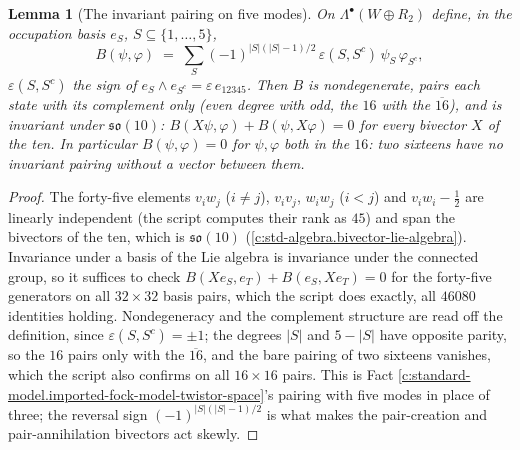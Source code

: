 \documentclass[11pt]{article}
\newtheorem{lemma}[theorem]{Lemma}
\theoremstyle{definition}
\theoremstyle{plain}
\providecommand{\so}{}\renewcommand{\so}{\mathfrak{so}}
\begin{document}
\begin{lemma}[The invariant pairing on five modes]\label{c:standard-model.invariant-pairing-five-modes}
On $\Lambda^{\bullet}(W \oplus R_{2})$ define, in the occupation basis $e_{S}$, $S \subseteq \{1, \ldots, 5\}$,
\[
B(\psi, \varphi) \;=\; \sum_{S} (-1)^{|S|(|S|-1)/2}\,\varepsilon(S, S^{c})\,\psi_{S}\,\varphi_{S^{c}},
\]
$\varepsilon(S, S^{c})$ the sign of $e_{S} \wedge e_{S^{c}} = \varepsilon\, e_{12345}$. Then $B$ is nondegenerate, pairs each state with its complement only (even degree with odd, the $16$ with the $\overline{16}$), and is invariant under $\so(10)$: $B(X\psi, \varphi) + B(\psi, X\varphi) = 0$ for every bivector $X$ of the ten. In particular $B(\psi, \varphi) = 0$ for $\psi, \varphi$ both in the $16$: two sixteens have no invariant pairing without a vector between them.
\end{lemma}
\begin{proof}
The forty-five elements $v_{i}w_{j}$ ($i \ne j$), $v_{i}v_{j}$, $w_{i}w_{j}$ ($i < j$) and $v_{i}w_{i} - \tfrac12$ are linearly independent (the script computes their rank as $45$) and span the bivectors of the ten, which is $\so(10)$ (\ref{c:std-algebra.bivector-lie-algebra}). Invariance under a basis of the Lie algebra is invariance under the connected group, so it suffices to check $B(Xe_{S}, e_{T}) + B(e_{S}, Xe_{T}) = 0$ for the forty-five generators on all $32 \times 32$ basis pairs, which the script does exactly, all $46080$ identities holding. Nondegeneracy and the complement structure are read off the definition, since $\varepsilon(S, S^{c}) = \pm 1$; the degrees $|S|$ and $5 - |S|$ have opposite parity, so the $16$ pairs only with the $\overline{16}$, and the bare pairing of two sixteens vanishes, which the script also confirms on all $16 \times 16$ pairs. This is Fact \ref{c:standard-model.imported-fock-model-twistor-space}'s pairing with five modes in place of three; the reversal sign $(-1)^{|S|(|S|-1)/2}$ is what makes the pair-creation and pair-annihilation bivectors act skewly.

\end{proof}
\end{document}

